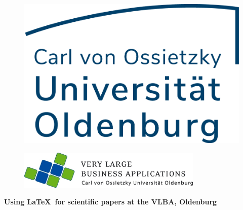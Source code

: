 \documentclass[11pt]{scrartcl}
\begin{document}
	

\begin{titlepage}
	\begin{centering}
				
		\begin{figure}[h!]
			\centering
			\includegraphics[scale=0.7]{UOL-Logo-blue.png}    
		 \end{figure}

		\vspace*{-0.2cm}

		\begin{figure}[h!]
		    \centering
		    \includegraphics[width=250pt]{VLBA-Logo}    
		\end{figure}

		\vspace*{0.4cm}
  
		\textsf{\Huge \textbf{Using \LaTeX\ for scientific papers at the VLBA, Oldenburg\\}}


\end{centering}
\end{titlepage}
\end{document}
